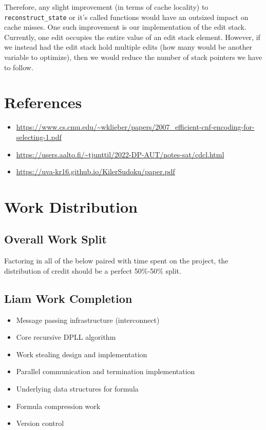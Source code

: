 \documentclass{article}
\begin{document}
Therefore, any slight improvement (in terms of cache locality) to \verb|reconstruct_state| or it's called functions would have an outsized impact on cache misses.
One such improvement is our implementation of the edit stack.
Currently, one edit occupies the entire value of an edit stack element.
However, if we instead had the edit stack hold multiple edits (how many would be another variable to optimize), then we would reduce the number of stack pointers we have to follow.

\section{References}

\begin{itemize}
    \item 
\url{https://www.cs.cmu.edu/~wklieber/papers/2007_efficient-cnf-encoding-for-selecting-1.pdf}
    \item
\url{https://users.aalto.fi/~tjunttil/2022-DP-AUT/notes-sat/cdcl.html}
    \item
\url{https://uva-kr16.github.io/KilerSudoku/paper.pdf}
\end{itemize}

\section{Work Distribution}

\subsection{Overall Work Split}

Factoring in all of the below paired with time spent on the project, the distribution of credit should be a perfect 50\%-50\% split.

\subsection{Liam Work Completion}
\begin{itemize}
    \item Message passing infrastructure (interconnect)
    \item Core recursive DPLL algorithm
    \item Work stealing design and implementation
    \item Parallel communication and termination implementation
    \item Underlying data structures for formula
    \item Formula compression work
    \item Version control
\end{itemize}
\end{document}

